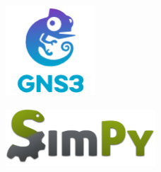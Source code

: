 \documentclass[compress]{beamer}
\begin{document}
\begin{frame}
\begin{columns}
\begin{column}{0.5\textwidth}
\begin{figure}
                    \centering
                    \includegraphics[width=0.3\textwidth]{../img/GNS3_logo.png}
                \end{figure}
                \begin{figure}
                    \centering
                    \includegraphics[width=0.5\textwidth]{../img/SimPy.png}
                \end{figure}
            \end{column}
        \end{columns}
    \end{frame}
\end{document}
